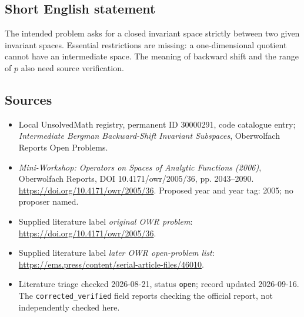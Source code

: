\documentclass[11pt]{article}
\begin{document}
\subsection{Short English statement}
The intended problem asks for a closed invariant space strictly between two given invariant spaces. Essential restrictions are missing: a one-dimensional quotient cannot have an intermediate space. The meaning of backward shift and the range of \(p\) also need source verification.
\subsection{Sources}
\begin{itemize}\item Local UnsolvedMath registry, permanent ID 30000291, code catalogue entry; \emph{Intermediate Bergman Backward-Shift Invariant Subspaces}, Oberwolfach Reports Open Problems.\item \emph{Mini-Workshop: Operators on Spaces of Analytic Functions (2006)}, Oberwolfach Reports, DOI 10.4171/owr/2005/36, pp. 2043--2090. \url{https://doi.org/10.4171/owr/2005/36}. Proposed year and year tag: 2005; no proposer named.\item Supplied literature label \emph{original OWR problem}: \url{https://doi.org/10.4171/owr/2005/36}.\item Supplied literature label \emph{later OWR open-problem list}: \url{https://ems.press/content/serial-article-files/46010}.\item Literature triage checked 2026-08-21, status \texttt{open}; record updated 2026-09-16. The \texttt{corrected\_verified} field reports checking the official report, not independently checked here.\end{itemize}
\end{document}
